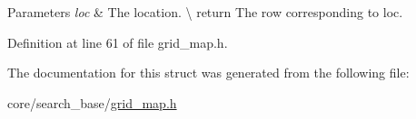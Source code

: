 \begin{DoxyParams}{Parameters}
{\em loc} & The location. \textbackslash{} return The row corresponding to {\ttfamily loc}. \\
\hline
\end{DoxyParams}


Definition at line 61 of file grid\+\_\+map.\+h.



The documentation for this struct was generated from the following file\+:\begin{DoxyCompactItemize}
\item 
core/search\+\_\+base/\hyperlink{grid__map_8h}{grid\+\_\+map.\+h}\end{DoxyCompactItemize}
